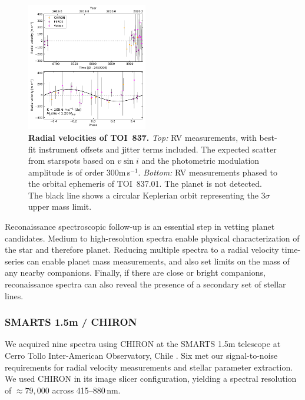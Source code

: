 \documentclass[12pt,twocolumn,tighten]{aastex63}
\newcommand{\tn}{TOI~837} %
\newcommand{\pn}{TOI~837.01} %
\begin{document}
\begin{figure}[!t]
	\begin{center}
		\leavevmode
		\includegraphics[width=0.47\textwidth]{f3.pdf}
	\end{center}
	\vspace{-0.7cm}
	\caption{
		{\bf Radial velocities of \tn.}
		{\it Top:} RV measurements, with best-fit instrument offsets
    and jitter terms included.  The expected scatter from starspots
    based on $v\sin i$ and the photometric modulation amplitude is of
    order 300m$\,$s$^{-1}$.
		{\it Bottom:}
    RV measurements phased to the orbital ephemeris of \pn.  The
    planet is not detected.  The black line shows a circular
    Keplerian orbit representing the $3\sigma$ upper mass limit.
		\label{fig:rvs}
	}
\end{figure}

Reconaissance spectroscopic follow-up is an essential step in vetting
planet candidates.  Medium to high-resolution spectra enable physical
characterization of the star and therefore planet.  Reducing multiple
spectra to a radial velocity time-series can enable planet mass
measurements, and also set limits on the mass of any nearby
companions.  Finally, if there are close or bright companions,
reconaissance spectra can also reveal the presence of a secondary set
of stellar lines.

\subsubsection{SMARTS 1.5m / CHIRON}
\label{subsec:chiron}

We acquired nine spectra using CHIRON at the SMARTS 1.5m telescope at
Cerro Tollo Inter-American Observatory, Chile
\citep{tokovinin_chironfiber_2013}.  Six met our signal-to-noise
requirements for radial velocity measurements and stellar parameter
extraction.  We used CHIRON in its image slicer configuration,
yielding a spectral resolution of $\approx 79{,}000$ across
415--880$\,$nm.
\end{document}

